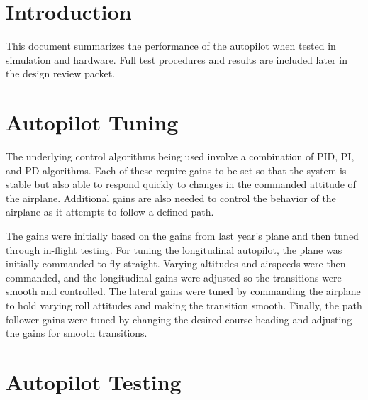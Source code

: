 \documentclass[]{auvsi_doc}
\begin{document}
\begin{AUVSITitlePage}
\begin{artifacttable}
\end{artifacttable}
\end{AUVSITitlePage}


\section{Introduction}
This document summarizes the performance of the autopilot when tested in simulation and hardware. Full test procedures and results are included later in the design review packet.

\section{Autopilot Tuning}

The underlying control algorithms being used involve a combination of PID, PI, and PD algorithms. Each of these require gains to be set so that the system is stable but also able to respond quickly to changes in the commanded attitude of the airplane. Additional gains are also needed to control the behavior of the airplane as it attempts to follow a defined path.


The gains were initially based on the gains from last year's plane and then tuned through in-flight testing. For tuning the longitudinal autopilot, the plane was initially commanded to fly straight. Varying altitudes and airspeeds were then commanded, and the longitudinal gains were adjusted so the transitions were smooth and controlled. The lateral gains were tuned by commanding the airplane to hold varying roll attitudes and making the transition smooth. Finally, the path follower gains were tuned by changing the desired course heading and adjusting the gains for smooth transitions.

\section{Autopilot Testing}
\end{document}
